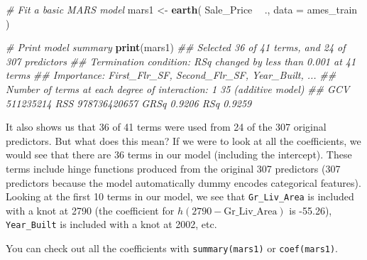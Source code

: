 \documentclass[]{krantz}
\makeatletter
\newenvironment{Shaded}{\begin{snugshade}}{\end{snugshade}}
\newcommand{\CommentTok}[1]{\textcolor[rgb]{0.37,0.37,0.37}{\textit{#1}}}
\newcommand{\DataTypeTok}[1]{\textcolor[rgb]{0.27,0.27,0.27}{#1}}
\newcommand{\DecValTok}[1]{\textcolor[rgb]{0.06,0.06,0.06}{#1}}
\newcommand{\KeywordTok}[1]{\textcolor[rgb]{0.27,0.27,0.27}{\textbf{#1}}}
\newcommand{\NormalTok}[1]{#1}
\newcommand{\OperatorTok}[1]{\textcolor[rgb]{0.43,0.43,0.43}{\textbf{#1}}}
\newcommand{\StringTok}[1]{\textcolor[rgb]{0.5,0.5,0.5}{#1}}
\newenvironment{kframe}{%
\medskip{}
\setlength{\fboxsep}{.8em}
 \def\at@end@of@kframe{}%
 \ifinner\ifhmode%
  \def\at@end@of@kframe{\end{minipage}}%
  \begin{minipage}{\columnwidth}%
 \fi\fi%
 \def\FrameCommand##1{\hskip\@totalleftmargin \hskip-\fboxsep
 \colorbox{shadecolor}{##1}\hskip-\fboxsep
     \hskip-\linewidth \hskip-\@totalleftmargin \hskip\columnwidth}%
 \MakeFramed {\advance\hsize-\width
   \@totalleftmargin\z@ \linewidth\hsize
   \@setminipage}}%
 {\par\unskip\endMakeFramed%
 \at@end@of@kframe}
\newenvironment{block}[1]
  {
  \begin{itemize}
  \renewcommand{\labelitemi}{
    \raisebox{-.7\height}[0pt][0pt]{
      {\setkeys{Gin}{width=3em,keepaspectratio}\texttt{[image: icons/\#1]}}
    }
  }
  \setlength{\fboxsep}{1em}
  \begin{kframe}
  \item
  }
  {
  \end{kframe}
  \end{itemize}
  }
\newenvironment{tip}
  {\begin{block}{tip}}
  {\end{block}}
\renewenvironment{Shaded}{\begin{kframe}}{\end{kframe}}
\makeatother
\begin{document}
\begin{Shaded}
\begin{Highlighting}[]
\CommentTok{# Fit a basic MARS model}
\NormalTok{mars1 <-}\StringTok{ }\KeywordTok{earth}\NormalTok{(}
\NormalTok{  Sale_Price }\OperatorTok{~}\StringTok{ }\NormalTok{.,  }
  \DataTypeTok{data =}\NormalTok{ ames_train   }
\NormalTok{)}

\CommentTok{# Print model summary}
\KeywordTok{print}\NormalTok{(mars1)}
\CommentTok{## Selected 36 of 41 terms, and 24 of 307 predictors}
\CommentTok{## Termination condition: RSq changed by less than 0.001 at 41 terms}
\CommentTok{## Importance: First_Flr_SF, Second_Flr_SF, Year_Built, ...}
\CommentTok{## Number of terms at each degree of interaction: 1 35 (additive model)}
\CommentTok{## GCV 511235214    RSS 978736420657    GRSq 0.9206    RSq 0.9259}
\end{Highlighting}
\end{Shaded}

It also shows us that 36 of 41 terms were used from 24 of the 307 original predictors. But what does this mean? If we were to look at all the coefficients, we would see that there are 36 terms in our model (including the intercept). These terms include hinge functions produced from the original 307 predictors (307 predictors because the model automatically dummy encodes categorical features). Looking at the first 10 terms in our model, we see that \texttt{Gr\_Liv\_Area} is included with a knot at 2790 (the coefficient for \(h\left(2790-\text{Gr\_Liv\_Area}\right)\) is -55.26), \texttt{Year\_Built} is included with a knot at 2002, etc.

\begin{tip}
You can check out all the coefficients with \texttt{summary(mars1)} or
\texttt{coef(mars1)}.
\end{tip}

\begin{Shaded}
\end{Shaded}
\end{document}
